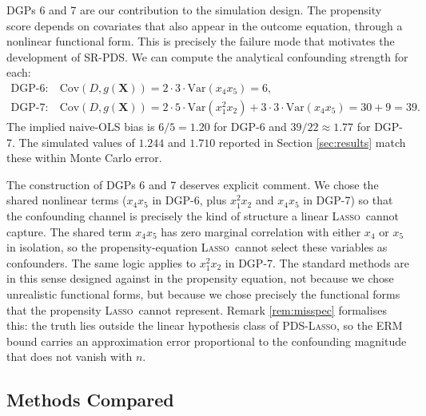 \documentclass[11pt, a4paper]{article}
\theoremstyle{plain}
\theoremstyle{definition}
\theoremstyle{remark}
\newcommand{\lasso}{\textsc{Lasso}}
\newcommand{\pds}{\textsc{PDS}}
\newcommand{\epds}{\textsc{SR-PDS}}
\begin{document}
DGPs 6 and 7 are our contribution to the simulation design. The
propensity score depends on covariates that also appear in the
outcome equation, through a nonlinear functional form. This is
precisely the failure mode that motivates the development of
\epds. We can compute the analytical confounding strength for
each:
\begin{align}
    \text{DGP-6:}\quad
    & \text{Cov}(D, g(\bm{X})) = 2 \cdot 3 \cdot \text{Var}(x_4 x_5) = 6, \\
    \text{DGP-7:}\quad
    & \text{Cov}(D, g(\bm{X})) = 2 \cdot 5 \cdot \text{Var}(x_1^2 x_2) + 3 \cdot 3 \cdot \text{Var}(x_4 x_5) = 30 + 9 = 39.
\end{align}
The implied naive-OLS bias is $6/5 = 1.20$ for DGP-6 and
$39/22 \approx 1.77$ for DGP-7. The simulated values of
$1.244$ and $1.710$ reported in Section \ref{sec:results} match
these within Monte Carlo error.

The construction of DGPs 6 and 7 deserves explicit comment. We chose the shared nonlinear terms ($x_4 x_5$ in
DGP-6, plus $x_1^2 x_2$ and $x_4 x_5$ in DGP-7) so that the
confounding channel is precisely the kind of structure a linear
\lasso\ cannot capture. The shared term $x_4 x_5$ has zero
marginal correlation with either $x_4$ or $x_5$ in isolation, so
the propensity-equation \lasso\ cannot select these variables as
confounders. The same logic applies to $x_1^2 x_2$ in DGP-7. The
standard methods are in this sense designed against in the
propensity equation, not because we chose unrealistic functional
forms, but because we chose precisely the functional forms that
the propensity \lasso\ cannot represent. Remark
\ref{rem:misspec} formalises this: the truth lies outside the
linear hypothesis class of \pds-\lasso, so the ERM bound
carries an approximation error proportional to the confounding
magnitude that does not vanish with $n$.

\subsection{Methods Compared}
\end{document}
